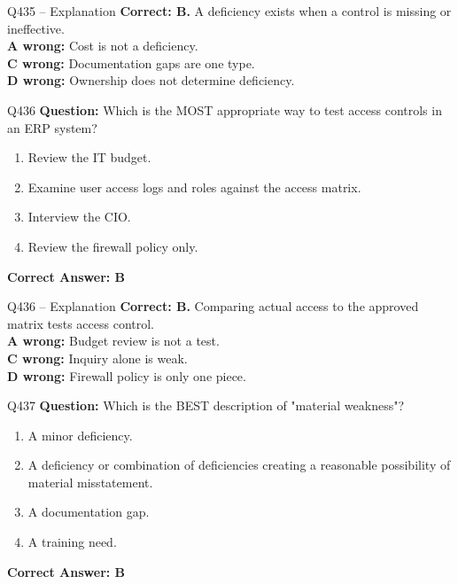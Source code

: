 \documentclass[aspectratio=169,10pt]{beamer}
\begin{document}
	\begin{frame}[t]{Q435 -- Explanation}
		\small
		\textbf{Correct: B.} A deficiency exists when a control is missing or ineffective. \\[4pt]
		\textbf{A wrong:} Cost is not a deficiency. \\[2pt]
		\textbf{C wrong:} Documentation gaps are one type. \\[2pt]
		\textbf{D wrong:} Ownership does not determine deficiency.
	\end{frame}
	
	\begin{frame}[t]{Q436}
		\small
		\textbf{Question:} Which is the MOST appropriate way to test access controls in an ERP system?
		\begin{enumerate}[label=\Alph*.,itemsep=1pt,topsep=2pt]
			\item Review the IT budget.
			\item Examine user access logs and roles against the access matrix.
			\item Interview the CIO.
			\item Review the firewall policy only.
		\end{enumerate}
		\vspace{4pt}
		\textbf{Correct Answer: B}
	\end{frame}
	
	\begin{frame}[t]{Q436 -- Explanation}
		\small
		\textbf{Correct: B.} Comparing actual access to the approved matrix tests access control. \\[4pt]
		\textbf{A wrong:} Budget review is not a test. \\[2pt]
		\textbf{C wrong:} Inquiry alone is weak. \\[2pt]
		\textbf{D wrong:} Firewall policy is only one piece.
	\end{frame}
	
	\begin{frame}[t]{Q437}
		\small
		\textbf{Question:} Which is the BEST description of "material weakness"?
		\begin{enumerate}[label=\Alph*.,itemsep=1pt,topsep=2pt]
			\item A minor deficiency.
			\item A deficiency or combination of deficiencies creating a reasonable possibility of material misstatement.
			\item A documentation gap.
			\item A training need.
		\end{enumerate}
		\vspace{4pt}
		\textbf{Correct Answer: B}
	\end{frame}
	
\end{document}
